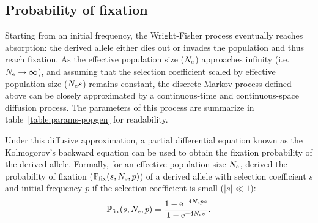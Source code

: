 \subsection{Probability of fixation}

Starting from an initial frequency, the Wright-Fisher process eventually reaches absorption: the derived \gls{allele} either dies out or invades the population and thus reach fixation.
As the \gls{effective population size} ($N_{\text{e}}$) approaches infinity (i.e.~$ N_{\text{e}} \to \infty$), and assuming that the selection coefficient scaled by \gls{effective population size} ($N_{\text{e}} s $) remains constant, the discrete Markov process defined above can be closely approximated by a continuous-time and continuous-space diffusion process.
The parameters of this process are summarize in table~\ref{table:params-popgen} for readability.

\begin{table}[htbp]
    \centering
    \noindent{}
    \caption[Parameters of population genetics]{Parameters of population genetics}\label{table:params-popgen}
\end{table}

Under this diffusive approximation, a partial differential equation known as the Kolmogorov's backward equation can be used to obtain the fixation probability of the derived \gls{allele}.
Formally, for an \gls{effective population size} $N_{\text{e}}$, \citet{Kimura1962} derived the probability of fixation ($\mathbb{P}_{\text{fix}}(s, N_{\text{e}}, p)$) of a derived \gls{allele} with selection coefficient $s$ and initial frequency $p$ if the selection coefficient is small ($|s| \ll 1$):
\begin{equation}
    \mathbb{P}_{\text{fix}}(s, N_{\text{e}}, p) = \dfrac{1 - \text{e}^{-4 N_{\text{e}} p s }}{1 - \text{e}^{-4 N_{\text{e}} s}}.
\end{equation}

